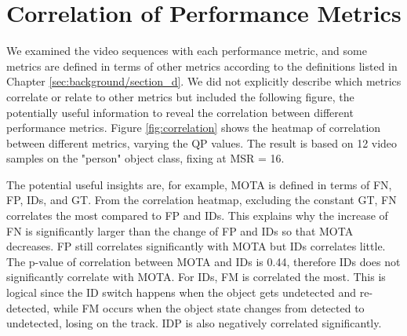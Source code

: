 \section{Correlation of Performance Metrics}
\label{sec:appendix/correlation}

We examined the video sequences with each performance metric, and some metrics are defined in terms of other metrics according to the definitions listed in Chapter \ref{sec:background/section_d}. We did not explicitly describe which metrics correlate or relate to other metrics but included the following figure, the potentially useful information to reveal the correlation between different performance metrics. Figure \ref{fig:correlation} shows the heatmap of correlation between different metrics, varying the QP values. The result is based on 12 video samples on the "person" object class, fixing at MSR = 16.

The potential useful insights are, for example, MOTA is defined in terms of FN, FP, IDs, and GT. From the correlation heatmap, excluding the constant GT, FN correlates the most compared to FP and IDs. This explains why the increase of FN is significantly larger than the change of FP and IDs so that MOTA decreases. FP still correlates significantly with MOTA but IDs correlates little. The p-value of correlation between MOTA and IDs is 0.44, therefore IDs does not significantly correlate with MOTA. For IDs, FM is correlated the most. This is logical since the ID switch happens when the object gets undetected and re-detected, while FM occurs when the object state changes from detected to undetected, losing on the track. IDP is also negatively correlated significantly.
